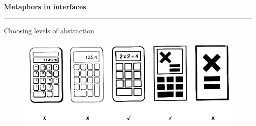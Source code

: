 \documentclass[pdf]{beamer}
\begin{document}
\begin{frame}
{\textbf{Metaphors in interfaces}}{\textcolor{red}{\rule{12cm}{1.2pt}}}

\large{ Choosing levels of abstraction }

\bigskip
\bigskip
\bigskip
\bigskip

\begin{figure}
\includegraphics[scale=0.65]{37_picture.png}
\end{figure}
    
    \vspace{145px}
   
    \vspace{35px}

\end{frame}
\end{document}
